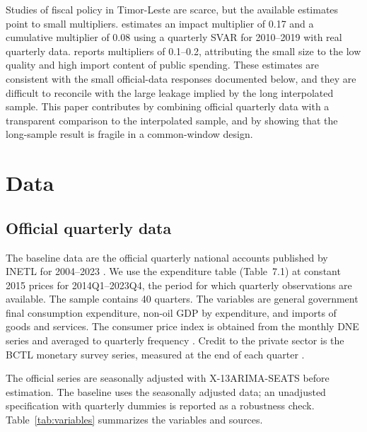 \documentclass[11pt,a4paper]{article}
\begin{document}
Studies of fiscal policy in Timor-Leste are scarce, but the available estimates point to small multipliers. \textcite{worldbank2021} estimates an impact multiplier of 0.17 and a cumulative multiplier of 0.08 using a quarterly SVAR for 2010--2019 with real quarterly data. \textcite{imf2024} reports multipliers of 0.1--0.2, attributing the small size to the low quality and high import content of public spending. These estimates are consistent with the small official-data responses documented below, and they are difficult to reconcile with the large leakage implied by the long interpolated sample. This paper contributes by combining official quarterly data with a transparent comparison to the interpolated sample, and by showing that the long-sample result is fragile in a common-window design.

\section{Data}
\label{sec:data}

\subsection{Official quarterly data}
\label{sec:official}

The baseline data are the official quarterly national accounts published by INETL for 2004--2023 \parencite{inetl2023}. We use the expenditure table (Table~7.1) at constant 2015 prices for 2014Q1--2023Q4, the period for which quarterly observations are available. The sample contains 40 quarters. The variables are general government final consumption expenditure, non-oil GDP by expenditure, and imports of goods and services. The consumer price index is obtained from the monthly DNE series and averaged to quarterly frequency \parencite{dne_cpi}. Credit to the private sector is the BCTL monetary survey series, measured at the end of each quarter \parencite{bctl2024}.

The official series are seasonally adjusted with X-13ARIMA-SEATS before estimation. The baseline uses the seasonally adjusted data; an unadjusted specification with quarterly dummies is reported as a robustness check. Table~\ref{tab:variables} summarizes the variables and sources.
\end{document}
